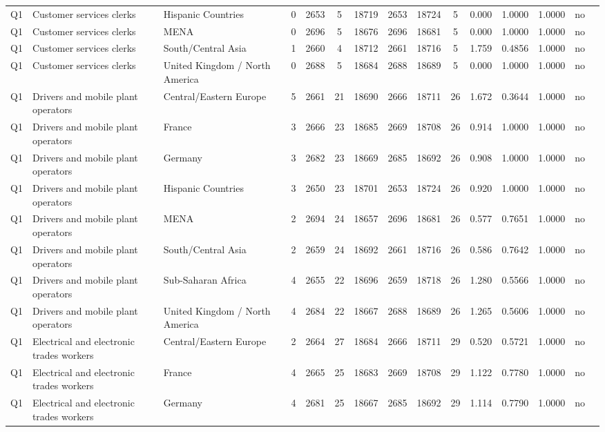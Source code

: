 \begin{longtable}{lllrcccccccccll}
Q1 & Customer services clerks & Hispanic Countries & 0 & 2653 & 5 & 18719 & 2653 & 18724 & 5 & 0.000 & 1.0000 & 1.0000 & no \\
Q1 & Customer services clerks & MENA & 0 & 2696 & 5 & 18676 & 2696 & 18681 & 5 & 0.000 & 1.0000 & 1.0000 & no \\
Q1 & Customer services clerks & South/Central Asia & 1 & 2660 & 4 & 18712 & 2661 & 18716 & 5 & 1.759 & 0.4856 & 1.0000 & no \\
Q1 & Customer services clerks & United Kingdom / North America & 0 & 2688 & 5 & 18684 & 2688 & 18689 & 5 & 0.000 & 1.0000 & 1.0000 & no \\
Q1 & Drivers and mobile plant operators & Central/Eastern Europe & 5 & 2661 & 21 & 18690 & 2666 & 18711 & 26 & 1.672 & 0.3644 & 1.0000 & no \\
Q1 & Drivers and mobile plant operators & France & 3 & 2666 & 23 & 18685 & 2669 & 18708 & 26 & 0.914 & 1.0000 & 1.0000 & no \\
Q1 & Drivers and mobile plant operators & Germany & 3 & 2682 & 23 & 18669 & 2685 & 18692 & 26 & 0.908 & 1.0000 & 1.0000 & no \\
Q1 & Drivers and mobile plant operators & Hispanic Countries & 3 & 2650 & 23 & 18701 & 2653 & 18724 & 26 & 0.920 & 1.0000 & 1.0000 & no \\
Q1 & Drivers and mobile plant operators & MENA & 2 & 2694 & 24 & 18657 & 2696 & 18681 & 26 & 0.577 & 0.7651 & 1.0000 & no \\
Q1 & Drivers and mobile plant operators & South/Central Asia & 2 & 2659 & 24 & 18692 & 2661 & 18716 & 26 & 0.586 & 0.7642 & 1.0000 & no \\
Q1 & Drivers and mobile plant operators & Sub-Saharan Africa & 4 & 2655 & 22 & 18696 & 2659 & 18718 & 26 & 1.280 & 0.5566 & 1.0000 & no \\
Q1 & Drivers and mobile plant operators & United Kingdom / North America & 4 & 2684 & 22 & 18667 & 2688 & 18689 & 26 & 1.265 & 0.5606 & 1.0000 & no \\
Q1 & Electrical and electronic trades workers & Central/Eastern Europe & 2 & 2664 & 27 & 18684 & 2666 & 18711 & 29 & 0.520 & 0.5721 & 1.0000 & no \\
Q1 & Electrical and electronic trades workers & France & 4 & 2665 & 25 & 18683 & 2669 & 18708 & 29 & 1.122 & 0.7780 & 1.0000 & no \\
Q1 & Electrical and electronic trades workers & Germany & 4 & 2681 & 25 & 18667 & 2685 & 18692 & 29 & 1.114 & 0.7790 & 1.0000 & no \\

\end{longtable}
